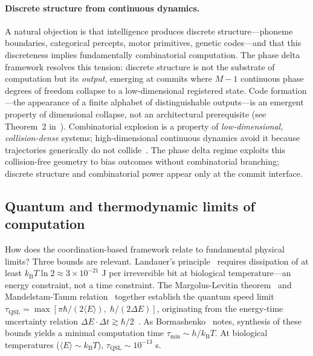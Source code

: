 \documentclass[12pt]{article}
\newcommand{\kB}{k_{\mathrm{B}}}
\begin{document}
\paragraph{Discrete structure from continuous dynamics.} A natural objection is that intelligence produces discrete structure---phoneme boundaries, categorical percepts, motor primitives, genetic codes---and that this discreteness implies fundamentally combinatorial computation. The phase delta framework resolves this tension: discrete structure is not the substrate of computation but its \emph{output}, emerging at commits where $M-1$ continuous phase degrees of freedom collapse to a low-dimensional registered state. Code formation---the appearance of a finite alphabet of distinguishable outputs---is an emergent property of dimensional collapse, not an architectural prerequisite (see Theorem~2 in~\cite{todd2025intelligence}). Combinatorial explosion is a property of \emph{low-dimensional, collision-dense} systems; high-dimensional continuous dynamics avoid it because trajectories generically do not collide~\cite{todd2025intelligence}. The phase delta regime exploits this collision-free geometry to bias outcomes without combinatorial branching; discrete structure and combinatorial power appear only at the commit interface.

\subsection{Quantum and thermodynamic limits of computation}

How does the coordination-based framework relate to fundamental physical limits? Three bounds are relevant. Landauer's principle~\cite{landauer1961,bormashenko2024} requires dissipation of at least $\kB T \ln 2 \approx 3 \times 10^{-21}$ J per irreversible bit at biological temperature---an energy constraint, not a time constraint. The Margolus-Levitin theorem~\cite{margolus1998} and Mandelstam-Tamm relation~\cite{mandelstam1945} together establish the quantum speed limit $\tau_{\mathrm{QSL}} = \max[\pi\hbar/(2\langle E\rangle),\; \hbar/(2\Delta E)]$, originating from the energy-time uncertainty relation $\Delta E \cdot \Delta t \gtrsim \hbar/2$~\cite{khrennikov2021,igamberdiev2025constraints,igamberdiev2026autopoietic}. As Bormashenko~\cite{bormashenko2024} notes, synthesis of these bounds yields a minimal computation time $\tau_{\min} \sim h/\kB T$. At biological temperatures ($\langle E\rangle \sim \kB T$), $\tau_{\mathrm{QSL}} \sim 10^{-13}$ s.
\end{document}
